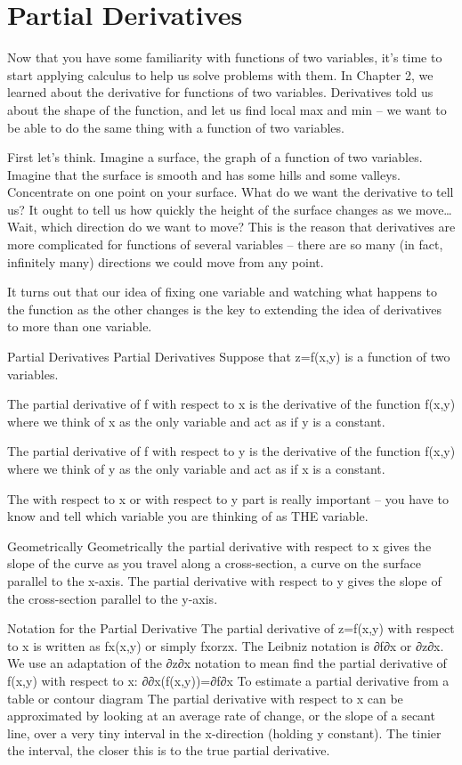 \section{Partial Derivatives}
\label{sec:derivatives}

Now that you have some familiarity with functions of two variables, it's time to start applying calculus to help us solve problems with them. In Chapter 2, we learned about the derivative for functions of two variables. Derivatives told us about the shape of the function, and let us find local max and min – we want to be able to do the same thing with a function of two variables.

First let's think. Imagine a surface, the graph of a function of two variables. Imagine that the surface is smooth and has some hills and some valleys. Concentrate on one point on your surface. What do we want the derivative to tell us? It ought to tell us how quickly the height of the surface changes as we move… Wait, which direction do we want to move? This is the reason that derivatives are more complicated for functions of several variables – there are so many (in fact, infinitely many) directions we could move from any point.

It turns out that our idea of fixing one variable and watching what happens to the function as the other changes is the key to extending the idea of derivatives to more than one variable.

Partial Derivatives
Partial Derivatives
Suppose that z=f(x,y) is a function of two variables.

The partial derivative of f with respect to x is the derivative of the function f(x,y) where we think of x as the only variable and act as if y is a constant.

The partial derivative of f with respect to y is the derivative of the function f(x,y) where we think of y as the only variable and act as if x is a constant.

The with respect to x or with respect to y part is really important – you have to know and tell which variable you are thinking of as THE variable.

Geometrically
Geometrically the partial derivative with respect to x gives the slope of the curve as you travel along a cross-section, a curve on the surface parallel to the x-axis. The partial derivative with respect to y gives the slope of the cross-section parallel to the y-axis.

Notation for the Partial Derivative
The partial derivative of z=f(x,y) with respect to x is written as
fx(x,y)
or simply
fxorzx.
The Leibniz notation is
∂f∂x
or
∂z∂x.
We use an adaptation of the ∂z∂x notation to mean find the partial derivative of f(x,y) with respect to x:
∂∂x(f(x,y))=∂f∂x
To estimate a partial derivative from a table or contour diagram
The partial derivative with respect to x can be approximated by looking at an average rate of change, or the slope of a secant line, over a very tiny interval in the x-direction (holding y constant). The tinier the interval, the closer this is to the true partial derivative.

